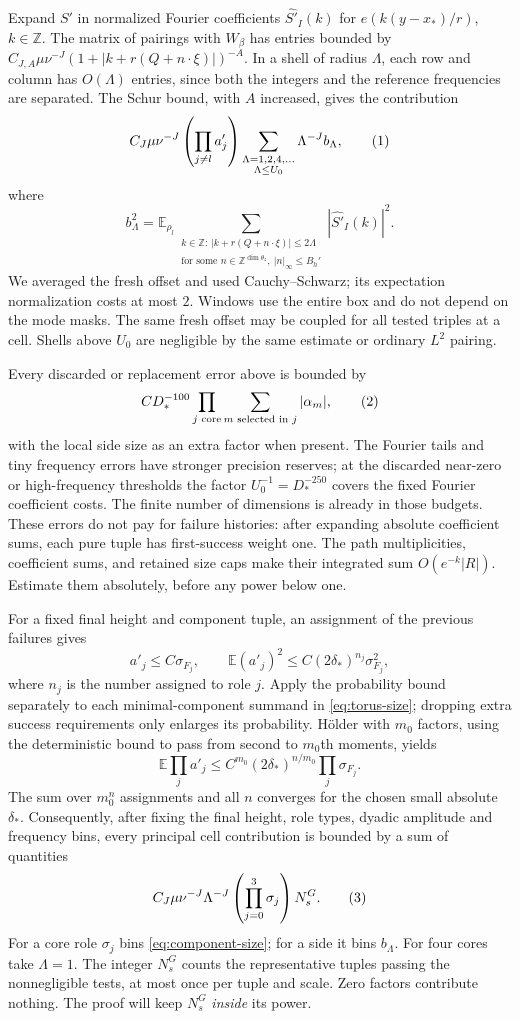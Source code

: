 \documentclass[11pt]{article}
\theoremstyle{definition}
\newcommand{\Z}{\mathbb Z}
\newcommand{\E}{\mathbb E}
\newcommand{\eqtag}[1]{\refstepcounter{equation}\tag{\theequation}\label{#1}}
\numberwithin{equation}{section}
\begin{document}
Expand $S'$ in normalized Fourier coefficients $\widehat{S'}_I(k)$ for $e(k(y-x_*)/r)$, $k\in\Z$. The matrix of pairings with $W_\beta$ has entries bounded by $C_{J,A}\mu\nu^{-J}(1+|k+r(Q+n\cdot\xi)|)^{-A}$. In a shell of radius $\Lambda$, each row and column has $O(\Lambda)$ entries, since both the integers and the reference frequencies are separated. The Schur bound, with $A$ increased, gives the contribution
\[
 C_J\mu\nu^{-J}\left(\prod_{j\ne l}a'_j\right)
 \sum_{\substack{\Lambda=1,2,4,\ldots\\\Lambda\le U_0}}\Lambda^{-J}b_\Lambda,
 \eqtag{eq:side-windows}
\]
where
\[
 b_\Lambda^2=\E_{\rho_l}\sum_{\substack{k\in\Z:\,|k+r(Q+n\cdot\xi)|\le2\Lambda\\
 \text{for some }n\in\Z^{\dim\theta_z},\ |n|_\infty\le B_h'}}|\widehat{S'}_I(k)|^2.
\]
We averaged the fresh offset and used Cauchy--Schwarz; its expectation normalization costs at most $2$. Windows use the entire box and do not depend on the mode masks. The same fresh offset may be coupled for all tested triples at a cell. Shells above $U_0$ are negligible by the same estimate or ordinary $L^2$ pairing.

Every discarded or replacement error above is bounded by
\[
 CD_*^{-100}\prod_{j\text{ core}}\sum_{m\text{ selected in }j}|\alpha_m|,
 \eqtag{eq:core-numerical}
\]
with the local side size as an extra factor when present. The Fourier tails and tiny frequency errors have stronger precision reserves; at the discarded near-zero or high-frequency thresholds the factor $U_0^{-1}=D_*^{-250}$ covers the fixed Fourier coefficient costs. The finite number of dimensions is already in those budgets. These errors do not pay for failure histories: after expanding absolute coefficient sums, each pure tuple has first-success weight one. The path multiplicities, coefficient sums, and retained size caps make their integrated sum $O(e^{-k}|R|)$. Estimate them absolutely, before any power below one.

For a fixed final height and component tuple, an assignment of the previous failures gives
\[
 a'_j\le C\sigma_{F_j},\qquad \E(a'_j)^2\le C(2\delta_*)^{n_j}\sigma_{F_j}^2,
\]
where $n_j$ is the number assigned to role $j$. Apply the probability bound separately to each minimal-component summand in \eqref{eq:torus-size}; dropping extra success requirements only enlarges its probability. H\"older with $m_0$ factors, using the deterministic bound to pass from second to $m_0$th moments, yields
\[
 \E\prod_ja'_j\le C^{m_0}(2\delta_*)^{n/m_0}\prod_j\sigma_{F_j}.
\]
The sum over $m_0^n$ assignments and all $n$ converges for the chosen small absolute $\delta_*$. Consequently, after fixing the final height, role types, dyadic amplitude and frequency bins, every principal cell contribution is bounded by a sum of quantities
\[
 C_J\mu\nu^{-J}\Lambda^{-J}\left(\prod_{j=0}^3\sigma_j\right)N_s^G.
 \eqtag{eq:principal-core}
\]
For a core role $\sigma_j$ bins \eqref{eq:component-size}; for a side it bins $b_\Lambda$. For four cores take $\Lambda=1$. The integer $N_s^G$ counts the representative tuples passing the nonnegligible tests, at most once per tuple and scale. Zero factors contribute nothing. The proof will keep $N_s^G$ \emph{inside} its power.
\end{document}
